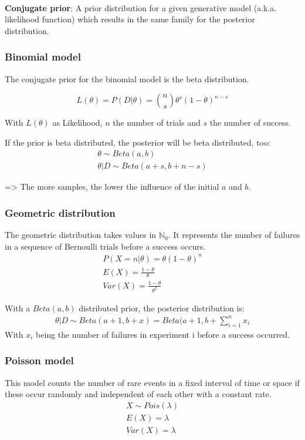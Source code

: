\mbox{}\\
\textbf{Conjugate prior}: A prior distribution for a given generative model (a.k.a. likelihood function) which results in the same family for the posterior distribution.

\subsubsection{Binomial model}
The conjugate prior for the binomial model is the beta distribution.

\begin{equation*}
	L(\theta) = P(D|\theta) = {{n}\choose{s}}\theta^s(1-\theta)^{n-s}
\end{equation*}

With $L(\theta)$ as Likelihood, $n$ the number of trials and $s$ the number of success.

If the prior is beta distributed, the posterior will be beta distributed, too:
\begin{gather*}
\theta\sim Beta(a, b)\\
\theta|D\sim Beta(a+s, b+n-s)
\end{gather*}

=> The more samples, the lower the influence of the initial $a$ and $b$.

\subsubsection{Geometric distribution}
The geometric distribution takes values in $\mathbb{N}_0$. It represents the number of failures in a sequence of Bernoulli trials before a success occurs.
\begin{gather*}
P(X=n|\theta) = \theta(1-\theta)^n\\
E(X) = \frac{1-\theta}{\theta}\\
Var(X) = \frac{1-\theta}{\theta^2}
\end{gather*}

With a $Beta(a,b)$ distributed prior, the posterior distribution is:
\begin{gather*}
\theta|D\sim Beta(a+1, b+x) = Beta(a+1, b+\sum_{i=1}^{n}x_i
\end{gather*}
With $x_i$ being the number of failures in experiment i before a success occurred.

\subsubsection{Poisson model}
This model counts the number of rare events in a fixed interval of time or space if these occur randomly and independent of each other with a constant rate.
\begin{gather*}
X\sim Pois(\lambda)\\
E(X) = \lambda\\
Var(X) = \lambda
\end{gather*}

